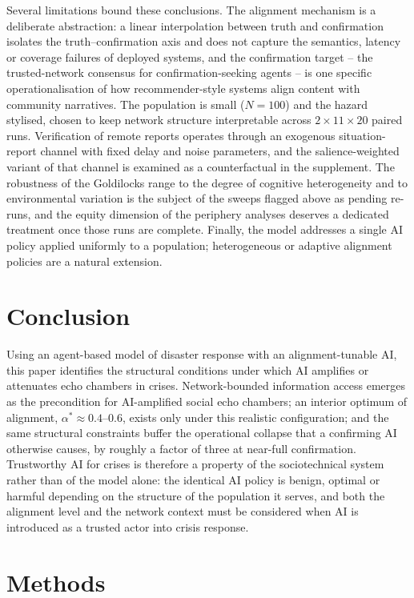 \documentclass[pdflatex,sn-basic]{sn-jnl}
\begin{document}
Several limitations bound these conclusions. The alignment mechanism is a deliberate abstraction: a linear interpolation between truth and confirmation isolates the truth--confirmation axis and does not capture the semantics, latency or coverage failures of deployed systems, and the confirmation target -- the trusted-network consensus for confirmation-seeking agents -- is one specific operationalisation of how recommender-style systems align content with community narratives. The population is small ($N = 100$) and the hazard stylised, chosen to keep network structure interpretable across $2 \times 11 \times 20$ paired runs. Verification of remote reports operates through an exogenous situation-report channel with fixed delay and noise parameters, and the salience-weighted variant of that channel is examined as a counterfactual in the supplement. The robustness of the Goldilocks range to the degree of cognitive heterogeneity and to environmental variation is the subject of the sweeps flagged above as pending re-runs, and the equity dimension of the periphery analyses deserves a dedicated treatment once those runs are complete. Finally, the model addresses a single AI policy applied uniformly to a population; heterogeneous or adaptive alignment policies are a natural extension.

\section{Conclusion}\label{sec:conclusion}

Using an agent-based model of disaster response with an alignment-tunable AI, this paper identifies the structural conditions under which AI amplifies or attenuates echo chambers in crises. Network-bounded information access emerges as the precondition for AI-amplified social echo chambers; an interior optimum of alignment, $\alpha^{*} \approx 0.4$--$0.6$, exists only under this realistic configuration; and the same structural constraints buffer the operational collapse that a confirming AI otherwise causes, by roughly a factor of three at near-full confirmation. Trustworthy AI for crises is therefore a property of the sociotechnical system rather than of the model alone: the identical AI policy is benign, optimal or harmful depending on the structure of the population it serves, and both the alignment level and the network context must be considered when AI is introduced as a trusted actor into crisis response.

\section{Methods}\label{sec:methods}
\end{document}
